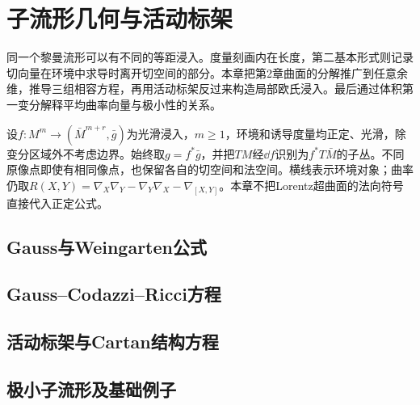 \chapter{子流形几何与活动标架}
\label{ch:13-submanifold-geometry}

同一个黎曼流形可以有不同的等距浸入。度量刻画内在长度，第二基本形式则记录切向量在环境中求导时离开切空间的部分。本章把第2章曲面的分解推广到任意余维，推导三组相容方程，再用活动标架反过来构造局部欧氏浸入。最后通过体积第一变分解释平均曲率向量与极小性的关系。

设$f:M^m\to(\bar M^{m+r},\bar g)$为光滑浸入，$m\geq1$，环境和诱导度量均正定、光滑，除变分区域外不考虑边界。始终取$g=f^*\bar g$，并把$TM$经$\dd f$识别为$f^*T\bar M$的子丛。不同原像点即使有相同像点，也保留各自的切空间和法空间。横线表示环境对象；曲率仍取$R(X,Y)=\nabla_X\nabla_Y-\nabla_Y\nabla_X-\nabla_{[X,Y]}$。本章不把Lorentz超曲面的法向符号直接代入正定公式。

\section{Gauss与Weingarten公式}


\section{Gauss--Codazzi--Ricci方程}


\section{活动标架与Cartan结构方程}


\section{极小子流形及基础例子}



